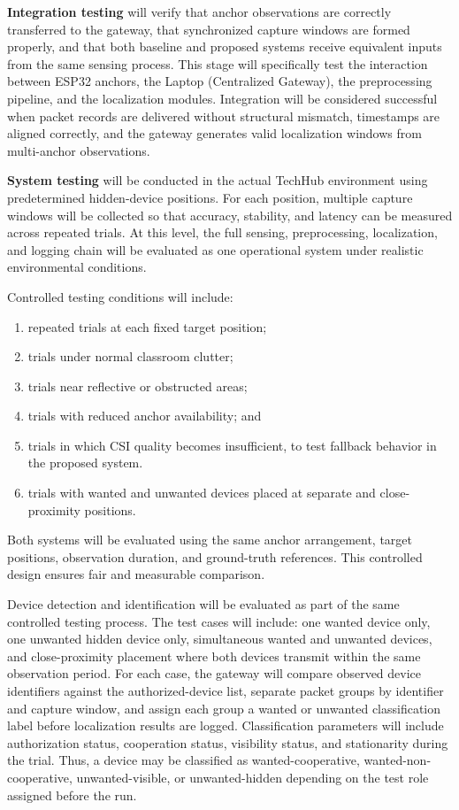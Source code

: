 \textbf{Integration testing} will verify that anchor observations are correctly transferred to the gateway, that synchronized capture windows are formed properly, and that both baseline and proposed systems receive equivalent inputs from the same sensing process. This stage will specifically test the interaction between ESP32 anchors, the Laptop (Centralized Gateway), the preprocessing pipeline, and the localization modules. Integration will be considered successful when packet records are delivered without structural mismatch, timestamps are aligned correctly, and the gateway generates valid localization windows from multi-anchor observations.

\textbf{System testing} will be conducted in the actual TechHub environment using predetermined hidden-device positions. For each position, multiple capture windows will be collected so that accuracy, stability, and latency can be measured across repeated trials. At this level, the full sensing, preprocessing, localization, and logging chain will be evaluated as one operational system under realistic environmental conditions.

Controlled testing conditions will include:

\begin{enumerate}
    \item repeated trials at each fixed target position;
    \item trials under normal classroom clutter;
    \item trials near reflective or obstructed areas;
    \item trials with reduced anchor availability; and
    \item trials in which CSI quality becomes insufficient, to test fallback behavior in the proposed system.
    \item trials with wanted and unwanted devices placed at separate and close-proximity positions.
\end{enumerate}

Both systems will be evaluated using the same anchor arrangement, target positions, observation duration, and ground-truth references. This controlled design ensures fair and measurable comparison.

Device detection and identification will be evaluated as part of the same controlled testing process. The test cases will include: one wanted device only, one unwanted hidden device only, simultaneous wanted and unwanted devices, and close-proximity placement where both devices transmit within the same observation period. For each case, the gateway will compare observed device identifiers against the authorized-device list, separate packet groups by identifier and capture window, and assign each group a wanted or unwanted classification label before localization results are logged. Classification parameters will include authorization status, cooperation status, visibility status, and stationarity during the trial. Thus, a device may be classified as wanted-cooperative, wanted-non-cooperative, unwanted-visible, or unwanted-hidden depending on the test role assigned before the run.

